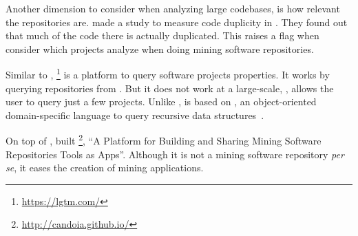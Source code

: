 Another dimension to consider when analyzing large codebases, is how relevant the repositories are.
\cite{Lopes:2017:DMC:3152284.3133908} made a study to measure code duplicity in \github{}.
They found out that much of the code there is actually duplicated.
This raises a flag when consider which projects analyze when doing mining software repositories.

Similar to \boa{}, \lgtm{}\footnote{\url{https://lgtm.com/}} is a platform to query software projects properties.
It works by querying repositories from \github{}.
But it does not work at a large-scale, \ie{}, \lgtm{} allows the user to query just a few projects.
Unlike \boa{}, \lgtm{} is based on \ql{}, an object-oriented domain-specific language to query recursive data structures~\cite{avgustinov_et_al:LIPIcs:2016:6096}.

On top of \boa{}, \cite{7962355} built \candoia{}\footnote{\url{http://candoia.github.io/}}, ``A Platform for Building and Sharing Mining Software Repositories Tools as Apps''.
Although it is not a mining software repository \emph{per se}, it eases the creation of mining applications.

